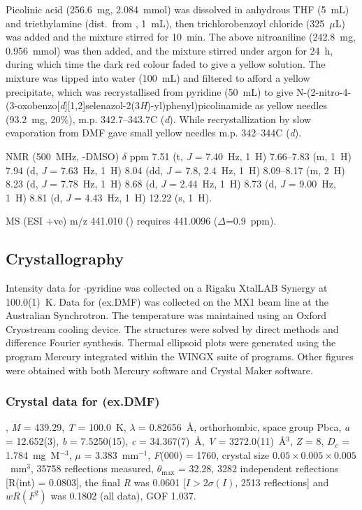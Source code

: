 \begin{refsection}
Picolinic acid (256.6~mg, 2.084~mmol) was dissolved in anhydrous THF (5~mL) and triethylamine (dist.\ from , 1~mL), then trichlorobenzoyl chloride (325~$\mu$L) was added and the mixture stirred for 10~min.
The above nitroaniline  (242.8~mg, 0.956~mmol) was then added, and the mixture stirred under argon for 24~h, during which time the dark red colour faded to give a yellow solution.
The mixture was tipped into water (100~mL) and filtered to afford a yellow precipitate, which was recrystallised from pyridine (50~mL) to give  N-(2-nitro-4-(3-oxobenzo[\emph{d}][1,2]selenazol-2(3\emph{H})-yl)phenyl)picolinamide  as yellow needles (93.2~mg, 20\%), m.p. 342.7--343.7\degree{}C (\emph{d}).
While recrystallization by slow evaporation from DMF gave small yellow needles m.p. 342--344\degree{}C (\emph{d}).

{\footnotesize

 NMR (500~MHz, -DMSO) $\delta$ ppm
7.51 (t, \emph{J} = 7.40~Hz, 1~H) 7.66--7.83 (m, 1~H) 7.94 (d, \emph{J} = 7.63~Hz, 1~H) 8.04 (dd, \emph{J} = 7.8, 2.4~Hz, 1~H) 8.09--8.17 (m, 2~H) 8.23 (d, \emph{J} = 7.78~Hz, 1~H) 8.68 (d, \emph{J} = 2.44~Hz, 1~H) 8.73 (d, \emph{J} = 9.00~Hz, 1~H) 8.81 (d, \emph{J} = 4.43~Hz, 1~H) 12.22 (s, 1~H).

MS (ESI +ve) m/z 441.010 ()  requires 441.0096 ($\Delta$=0.9~ppm).
}

\subsection{Crystallography}
Intensity data for $\cdot$pyridine was collected on a Rigaku XtalLAB Synergy at 100.0(1)~K.
Data for (ex.DMF) was collected on the MX1 beam line\autocite{Cowieson2015} at the Australian Synchrotron.
The temperature was maintained using an Oxford Cryostream cooling device.
The structures were solved by direct methods and difference Fourier synthesis.\autocite{Sheldrick2015}
Thermal ellipsoid plots were generated using the program Mercury\autocite{Macrae2008} integrated within the WINGX\autocite{Farrugia1999} suite of programs.
Other figures were obtained with both Mercury software and Crystal Maker software.

\subsubsection{Crystal data for \texorpdfstring{(ex.DMF)}{C19H12N4O4Se}}
, \emph{M} = 439.29, \emph{T} = 100.0~K, $\lambda$ = 0.82656~\AA, orthorhombic, space group Pbca, \emph{a} = 12.652(3), \emph{b} = 7.5250(15), \emph{c} = 34.367(7)~\AA, \emph{V} = 3272.0(11)~\AA$^3$, \emph{Z} = 8, $D_c$ = 1.784~mg~M$^{-3}$, $\mu$ = 3.383~mm$^{-1}$, \emph{F}(000) = 1760, crystal size $0.05 \times 0.005 \times 0.005$~mm$^3$, 35758 reflections measured, $\theta_{\max}$ = 32.28\degree{}, 3282 independent reflections [R(int) = 0.0803], the final \emph{R} was 0.0601 [$I > 2\sigma(I)$, 2513 reflections] and $wR(F^2)$ was 0.1802 (all data), GOF 1.037.


\end{refsection}
